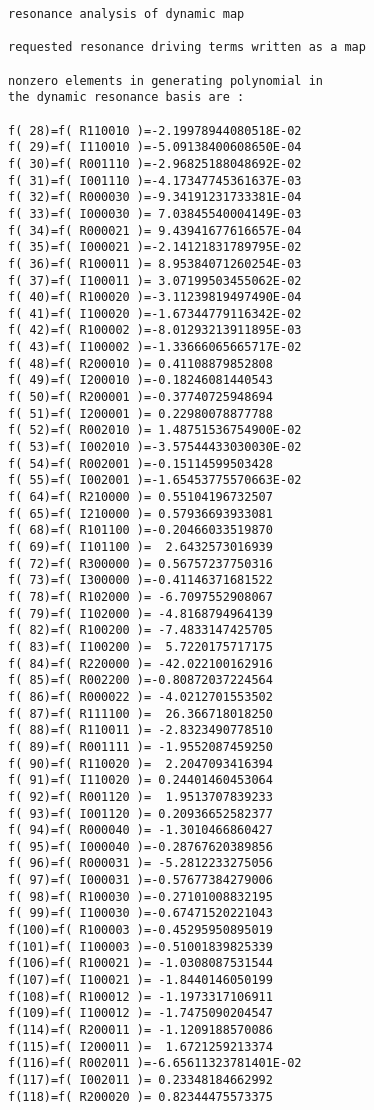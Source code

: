\begin{footnotesize}
\begin{verbatim}
resonance analysis of dynamic map

requested resonance driving terms written as a map

nonzero elements in generating polynomial in
the dynamic resonance basis are :

f( 28)=f( R110010 )=-2.19978944080518E-02
f( 29)=f( I110010 )=-5.09138400608650E-04
f( 30)=f( R001110 )=-2.96825188048692E-02
f( 31)=f( I001110 )=-4.17347745361637E-03
f( 32)=f( R000030 )=-9.34191231733381E-04
f( 33)=f( I000030 )= 7.03845540004149E-03
f( 34)=f( R000021 )= 9.43941677616657E-04
f( 35)=f( I000021 )=-2.14121831789795E-02
f( 36)=f( R100011 )= 8.95384071260254E-03
f( 37)=f( I100011 )= 3.07199503455062E-02
f( 40)=f( R100020 )=-3.11239819497490E-04
f( 41)=f( I100020 )=-1.67344779116342E-02
f( 42)=f( R100002 )=-8.01293213911895E-03
f( 43)=f( I100002 )=-1.33666065665717E-02
f( 48)=f( R200010 )= 0.41108879852808
f( 49)=f( I200010 )=-0.18246081440543
f( 50)=f( R200001 )=-0.37740725948694
f( 51)=f( I200001 )= 0.22980078877788
f( 52)=f( R002010 )= 1.48751536754900E-02
f( 53)=f( I002010 )=-3.57544433030030E-02
f( 54)=f( R002001 )=-0.15114599503428
f( 55)=f( I002001 )=-1.65453775570663E-02
f( 64)=f( R210000 )= 0.55104196732507
f( 65)=f( I210000 )= 0.57936693933081
f( 68)=f( R101100 )=-0.20466033519870
f( 69)=f( I101100 )=  2.6432573016939
f( 72)=f( R300000 )= 0.56757237750316
f( 73)=f( I300000 )=-0.41146371681522
f( 78)=f( R102000 )= -6.7097552908067
f( 79)=f( I102000 )= -4.8168794964139
f( 82)=f( R100200 )= -7.4833147425705
f( 83)=f( I100200 )=  5.7220175717175
f( 84)=f( R220000 )= -42.022100162916
f( 85)=f( R002200 )=-0.80872037224564
f( 86)=f( R000022 )= -4.0212701553502
f( 87)=f( R111100 )=  26.366718018250
f( 88)=f( R110011 )= -2.8323490778510
f( 89)=f( R001111 )= -1.9552087459250
f( 90)=f( R110020 )=  2.2047093416394
f( 91)=f( I110020 )= 0.24401460453064
f( 92)=f( R001120 )=  1.9513707839233
f( 93)=f( I001120 )= 0.20936652582377
f( 94)=f( R000040 )= -1.3010466860427
f( 95)=f( I000040 )=-0.28767620389856
f( 96)=f( R000031 )= -5.2812233275056
f( 97)=f( I000031 )=-0.57677384279006
f( 98)=f( R100030 )=-0.27101008832195
f( 99)=f( I100030 )=-0.67471520221043
f(100)=f( R100003 )=-0.45295950895019
f(101)=f( I100003 )=-0.51001839825339
f(106)=f( R100021 )= -1.0308087531544
f(107)=f( I100021 )= -1.8440146050199
f(108)=f( R100012 )= -1.1973317106911
f(109)=f( I100012 )= -1.7475090204547
f(114)=f( R200011 )= -1.1209188570086
f(115)=f( I200011 )=  1.6721259213374
f(116)=f( R002011 )=-6.65611323781401E-02
f(117)=f( I002011 )= 0.23348184662992
f(118)=f( R200020 )= 0.82344475573375

\end{verbatim}
\end{footnotesize}

